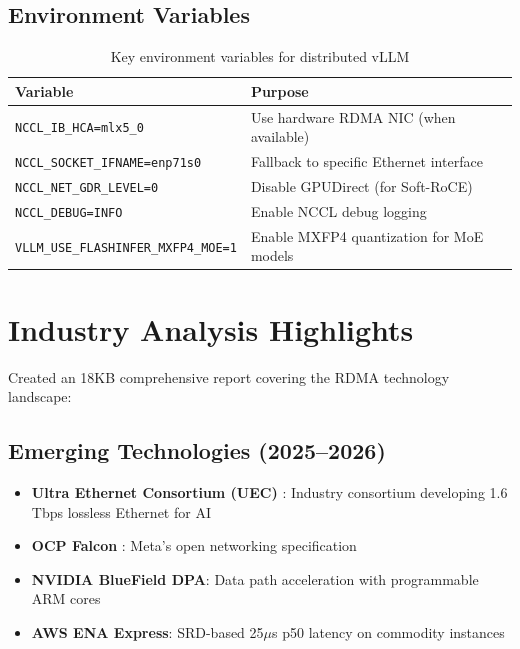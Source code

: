 \documentclass[10pt,letterpaper]{article}
\begin{document}
\subsection{Environment Variables}

\begin{table}[H]
\centering
\small
\begin{tabular}{@{}lp{8cm}@{}}
\toprule
\textbf{Variable} & \textbf{Purpose} \\
\midrule
\texttt{NCCL\_IB\_HCA=mlx5\_0} & Use hardware RDMA NIC (when available) \\
\texttt{NCCL\_SOCKET\_IFNAME=enp71s0} & Fallback to specific Ethernet interface \\
\texttt{NCCL\_NET\_GDR\_LEVEL=0} & Disable GPUDirect (for Soft-RoCE) \\
\texttt{NCCL\_DEBUG=INFO} & Enable NCCL debug logging \\
\texttt{VLLM\_USE\_FLASHINFER\_MXFP4\_MOE=1} & Enable MXFP4 quantization \cite{mxfp4-paper} for MoE models \\
\bottomrule
\end{tabular}
\caption{Key environment variables for distributed vLLM}
\end{table}

\section{Industry Analysis Highlights}

Created an 18KB comprehensive report covering the RDMA technology landscape:

\subsection{Emerging Technologies (2025--2026)}

\begin{itemize}[noitemsep]
    \item \textbf{Ultra Ethernet Consortium (UEC)} \cite{uec-spec}: Industry consortium developing 1.6 Tbps lossless Ethernet for AI
    \item \textbf{OCP Falcon} \cite{ocp-falcon}: Meta's open networking specification
    \item \textbf{NVIDIA BlueField DPA}: Data path acceleration with programmable ARM cores
    \item \textbf{AWS ENA Express}: SRD-based 25$\mu$s p50 latency on commodity instances
\end{itemize}
\end{document}
